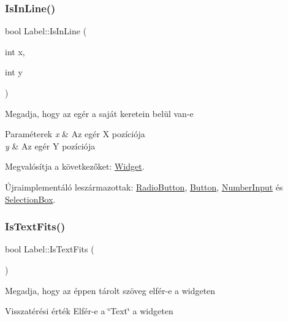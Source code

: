 \subsubsection{\texorpdfstring{Is\+In\+Line()}{IsInLine()}}
{\footnotesize\ttfamily bool Label\+::\+Is\+In\+Line (\begin{DoxyParamCaption}\item[{int}]{x,  }\item[{int}]{y }\end{DoxyParamCaption})\hspace{0.3cm}{\ttfamily [virtual]}}

Megadja, hogy az egér a saját keretein belül van-\/e 
\begin{DoxyParams}{Paraméterek}
{\em x} & Az egér X pozíciója \\
\hline
{\em y} & Az egér Y pozíciója \\
\hline
\end{DoxyParams}


Megvalósítja a következőket\+: \hyperlink{class_widget_a7a18323ef481add82e5edba5c0c6ec06}{Widget}.



Újraimplementáló leszármazottak\+: \hyperlink{class_radio_button_a94ab27ee37cdd639a185cb746ad7b32f}{Radio\+Button}, \hyperlink{class_button_a61832186fb0cf58c4c1c6fbbe572b61c}{Button}, \hyperlink{class_number_input_af364cc666a41dfa189e024464e4bc317}{Number\+Input} és \hyperlink{class_selection_box_a0378e1ec035f90dd04efac5d6a2c7132}{Selection\+Box}.

\mbox{\label{class_label_a0dcc047c736b8c20bcba6796e85f909e}} 
\subsubsection{\texorpdfstring{Is\+Text\+Fits()}{IsTextFits()}}
{\footnotesize\ttfamily bool Label\+::\+Is\+Text\+Fits (\begin{DoxyParamCaption}{ }\end{DoxyParamCaption})}

Megadja, hogy az éppen tárolt szöveg elfér-\/e a widgeten \begin{DoxyReturn}{Visszatérési érték}
Elfér-\/e a \char`\"{}\+Text\char`\"{} a widgeten 
\end{DoxyReturn}
\mbox{\label{class_label_ac22c98a976f1fb6f4b86ee9ac8dd50b2}} 
